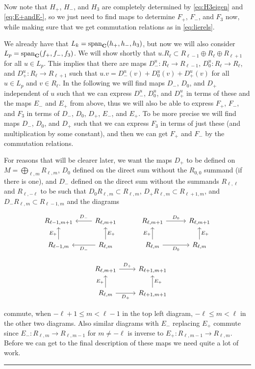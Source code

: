 Now note that $H_+$, $H_-$, and $H_3$ are completely determined by \cref{eq:H3eigen} and \cref{eq:E+andE-}, so we just need to find maps to determine $F_+$, $F_-$, and $F_3$ now, while making sure that we get commutation relations as in \cref{eq:lierels}.

We already have that $L_k=\operatorname{span}_{\mathbf{C}}(h_+,h_-,h_3)$, but now we will also consider $L_p=\operatorname{span}_{\mathbf{C}}(f_+,f_-,f_3)$. We will show shortly that $u.R_\ell \subset R_{\ell-1}\oplus R_\ell \oplus R_{\ell+1}$ for all $u\in L_p$. This implies that there are maps $D_-^{u}\colon R_\ell\to R_{\ell-1}$, $D_0^{u}\colon R_\ell\to R_\ell$, and $D_+^{u}\colon R_\ell\to R_{\ell+1}$ such that $u.v=D_-^{u}(v)+D_0^{u}(v)+D_+^{u}(v)$ for all $u\in L_p$ and $v\in R_\ell$. In the following we will find maps $D_-$, $D_0$, and $D_+$ independent of $u$ such that we can express $D_-^{u}$, $D_0^{u}$, and $D_+^{u}$ in terms of these and the maps $E_-$ and $E_+$ from above, thus we will also be able to express $F_+$, $F_-$, and $F_3$ in terms of $D_-$, $D_0$, $D_+$, $E_-$, and $E_+$. To be more precise we will find maps $D_-$, $D_0$, and $D_+$ such that we can express $F_3$ in terms of just these (and multiplication by some constant), and then we can get $F_+$ and $F_-$ by the commutation relations. 

For reasons that will be clearer later, we want the maps $D_+$ to be defined on $M=\bigoplus_{\ell,m} R_{\ell,m}$, $D_0$ defined on the direct sum without the $R_{0,0}$ summand (if there is one), and $D_-$ defined on the direct sum without the summands $R_{\ell,\ell}$ and $R_{\ell,-\ell}$ to be such that $D_0 R_{\ell,m}\subset R_{\ell,m}$, $D_+ R_{\ell,m} \subset R_{\ell+1,m}$, and $D_- R_{\ell,m} \subset R_{\ell-1,m}$ and the diagrams
\begin{center}
  \begin{equation}\label{eq:Ddiagrams}
    \begin{tikzcd}[baseline=(current bounding box.center)]
      R_{\ell-1,m+1} & R_{\ell,m+1} \ar[l,"D_-",swap] & R_{\ell,m+1} \ar[r,"D_0"] & R_{\ell,m+1}  \\
      R_{\ell-1,m} \ar[u,"E_+"] & R_{\ell,m} \ar[l,"D_-"] \ar[u,"E_+",swap] & R_{\ell,m} \ar[r,"D_0",swap] \ar[u,"E_+"] & R_{\ell,m} \ar[u,"E_+",swap] \\
      & R_{\ell,m+1} \ar[r,"D_+"] & R_{\ell+1,m+1} \\
      & R_{\ell,m} \ar[u,"E_+"] \ar[r,"D_+",swap] & R_{\ell+1,m+1} \ar[u,"E_+",swap]
    \end{tikzcd}
  \end{equation}
\end{center}
commute, when $-\ell+1\leq m < \ell-1$ in the top left diagram, $-\ell\leq m<\ell$ in the other two diagrams. Also similar diagrams with $E_-$ replacing $E_+$ commute since $E_-\colon R_{\ell,m}\to R_{\ell,m-1}$ for $m\neq -\ell$ is inverse to $E_+\colon R_{\ell,m-1}\to R_{\ell,m}$. Before we can get to the final description of these maps we need quite a lot of work.\fancybreak{* \quad * \quad * \quad * \quad *}

